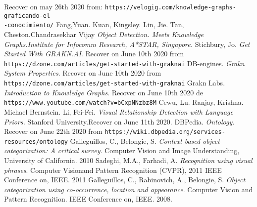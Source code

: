 \begin{thebibliography}{00}
  Recover on  may 26th 2020 from:
  \texttt{https://velogig.com/knowledge-graphs-graficando-el\\-conocimiento/}
  Fang,Yuan. Kuan, Kingsley. Lin, Jie. Tan, Cheston.Chandrasekhar Vijay
  \textit{Object Detection. Meets Knowledge Graphs.Institute for Infocomm
  Research, A*STAR, Singapore.}
  Stichbury, Jo. \textit{Get Started With GRAKN.AI}. Recover on  June 10th 2020 from
  \texttt{https://dzone.com/articles/get-started-with-graknai}
  DB-engines. \textit{Grakn System Properties}. Recover on  June 10th 
  2020 from \texttt{https://dzone.com/articles/get-started-with-graknai}
  Grakn Labs. \textit{Introduction to Knowledge Graphs}. Recover on June
  10th 2020 de \texttt{https://www.youtube.com/watch?v=bCxpNNzbz8M}
  Cewu, Lu. Ranjay,   Krishna. Michael Bernstein. Li, Fei-Fei.
  \textit{Visual Relationship Detection with Language Priors.}
  Stanford University.Recover on June 11th 2020.
  DBPedia. \textit{Ontology}. Recover on  June  22th 2020 from
  \texttt{https://wiki.dbpedia.org/services-resources/ontology}  
  Galleguillos, C., Belongie, S. \textit{Context based object categorization: A critical survey}. 
   Computer Vision and Image Understanding, University of California. 2010
  Sadeghi, M.A., Farhadi, A. \textit{Recognition using visual phrases}. 
  Computer Visionand Pattern Recognition (CVPR), 2011 IEEE Conference on, IEEE. 2011 
   Galleguillos,  C.,  Rabinovich,  A.,  Belongie,  S. \textit{Object  categorization  using  co-occurrence, location and appearance}.
   Computer Vision and Pattern Recognition. IEEE Conference on, IEEE. 2008.
\end{thebibliography}

